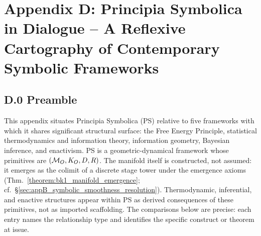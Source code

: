 \clearpage
{}
\chapter*{Appendix D: Principia Symbolica in Dialogue – A Reflexive Cartography of Contemporary Symbolic Frameworks}
\section*{D.0 Preamble}
\label{sec:appD_preamble_nature_of_appendix}
This appendix situates Principia Symbolica (PS) relative to five frameworks with which it shares significant structural surface: the Free Energy Principle, statistical thermodynamics and information theory, information geometry, Bayesian inference, and enactivism.
PS is a geometric-dynamical framework whose primitives are $(\mathcal{M}_O, K_O, D, R)$.
The manifold itself is constructed, not assumed: it emerges as the colimit of a discrete stage tower under the emergence axioms (Thm.~\ref{theorem:bk1_manifold_emergence}; cf.~\S\ref{sec:appB_symbolic_smoothness_resolution}).
Thermodynamic, inferential, and enactive structures appear within PS as derived consequences of these primitives, not as imported scaffolding.
The comparisons below are precise: each entry names the relationship type and identifies the specific construct or theorem at issue.

